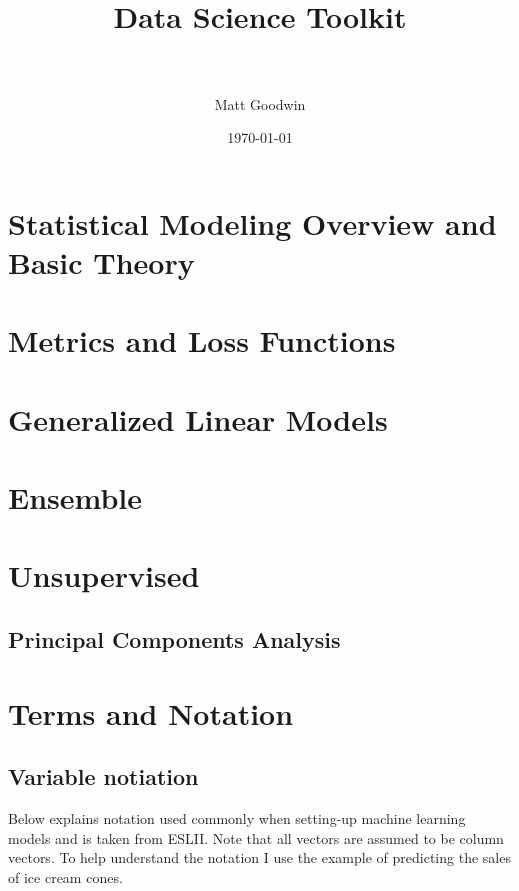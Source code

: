 \documentclass[paper=a4, fontsize=11pt]{scrartcl} %
\title{	
\normalfont \normalsize 
\horrule{0.5pt} \\[0.4cm] %
\huge Data Science Toolkit \\ %
\horrule{2pt} \\[0.5cm] %
}
\author{Matt Goodwin} %
\date{\normalsize\today} %
\numberwithin{equation}{section} %
\numberwithin{figure}{section} %
\numberwithin{table}{section} %
\begin{document}
\maketitle 

\tableofcontents
\newpage


\section{Statistical Modeling Overview and Basic Theory}


\section{Metrics and Loss Functions}


\section{Generalized Linear Models}


\section{Ensemble}


\section{Unsupervised}
\subsection{Principal Components Analysis}


\section{Terms and Notation}

\subsection{Variable notiation}
\label{sec:notation}

Below explains notation used commonly when setting-up machine learning models and is taken from ESLII. Note that all vectors are assumed to be column vectors. To help understand the notation I use the example of predicting the sales of ice cream cones. 
\vspace{2mm}
\end{document}
